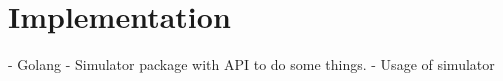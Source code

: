 \section*{Implementation}

- Golang
- Simulator package with API to do some things.
- Usage of simulator